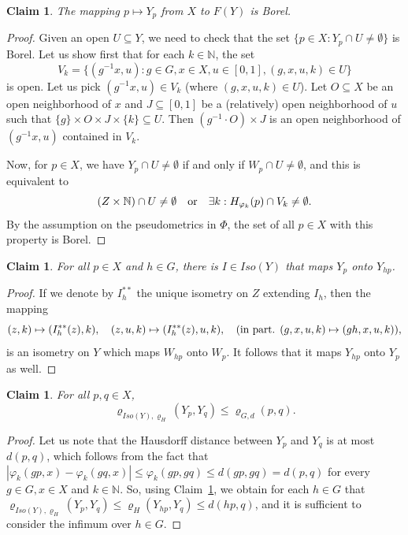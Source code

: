 \documentclass[a4paper]{amsart}
\theoremstyle{plain}
\newtheorem{claim}[theorem]{Claim}
\theoremstyle{remark}
\begin{document}
\begin{claim} \label{cl2}
The mapping $ p \mapsto Y_{p} $ from $ X $ to $ F(Y) $ is Borel.
\end{claim}

\begin{proof}
Given an open $ U \subseteq Y $, we need to check that the set $ \{ p \in X : Y_{p} \cap U \neq \emptyset \} $ is Borel. Let us show first that for each $ k \in \mathbb{N} $, the set
$$ V_{k} = \big\{ (g^{-1} x, u) : g \in G, x \in X, u \in [0, 1], (g, x, u, k) \in U \big\} $$
is open. Let us pick $ (g^{-1} x, u) \in V_{k} $ (where $ (g, x, u, k) \in U $). Let $ O \subseteq X $ be an open neighborhood of $ x $ and $ J \subseteq [0, 1] $ be a (relatively) open neighborhood of $ u $ such that $ \{ g \} \times O \times J \times \{ k \} \subseteq U $. Then $ (g^{-1} \cdot O) \times J $ is an open neighborhood of $ (g^{-1} x, u) $ contained in $ V_{k} $.

Now, for $ p \in X $, we have $ Y_{p} \cap U \neq \emptyset $ if and only if $ W_{p} \cap U \neq \emptyset $, and this is equivalent to
$$ (Z \times \mathbb{N}) \cap U \neq \emptyset \quad \textnormal{or} \quad \exists k : H_{\varphi_{k}}(p) \cap V_{k} \neq \emptyset. $$
By the assumption on the pseudometrics in $ \Phi $, the set of all $ p \in X $ with this property is Borel.
\end{proof}	


\begin{claim} \label{cl3}
For all $ p \in X $ and $ h \in G $, there is $ I \in Iso(Y) $ that maps $ Y_{p} $ onto $ Y_{hp} $.
\end{claim}

\begin{proof}
If we denote by $ I_{h}^{**} $ the unique isometry on $ Z $ extending $ I_{h} $, then the mapping
$$ (z, k) \mapsto (I_{h}^{**}(z), k), \quad (z, u, k) \mapsto (I_{h}^{**}(z), u, k), \quad \textnormal{(in part. $ (g, x, u, k) \mapsto (gh, x, u, k) $)}, $$
is an isometry on $ Y $ which maps $ W_{hp} $ onto $ W_{p} $. It follows that it maps $ Y_{hp} $ onto $ Y_{p} $ as well.
\end{proof}


\begin{claim} \label{cl4}
For all $ p, q \in X $,
$$ \varrho_{Iso(Y), \varrho_{H}}(Y_{p}, Y_{q}) \leq \varrho_{G, d}(p, q). $$
\end{claim}

\begin{proof}
Let us note that the Hausdorff distance between $ Y_{p} $ and $ Y_{q} $ is at most $ d(p, q) $, which follows from the fact that $ |\varphi_{k}(gp, x) - \varphi_{k}(gq, x)| \leq \varphi_{k}(gp, gq) \leq d(gp, gq) = d(p, q) $ for every $ g \in G, x \in X $ and $ k \in \mathbb{N} $. So, using Claim~\ref{cl3}, we obtain for each $ h \in G $ that $ \varrho_{Iso(Y), \varrho_{H}}(Y_{p}, Y_{q}) \leq \varrho_{H}(Y_{hp}, Y_{q}) \leq d(hp, q) $, and it is sufficient to consider the infimum over $ h \in G $.
\end{proof}
\end{document}
